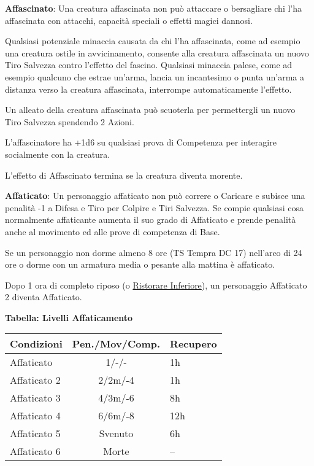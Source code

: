 \begin{multicols}{2}
\textbf{Affascinato}: Una creatura affascinata non può attaccare o bersagliare chi l'ha affascinata con attacchi, capacità speciali o effetti magici dannosi.

Qualsiasi potenziale minaccia causata da chi l'ha affascinata, come ad esempio una creatura ostile in avvicinamento, consente alla creatura affascinata un nuovo Tiro Salvezza contro l'effetto del fascino. Qualsiasi minaccia palese, come ad esempio qualcuno che estrae un'arma, lancia un incantesimo o punta un'arma a distanza verso la creatura affascinata, interrompe automaticamente l'effetto.

Un alleato della creatura affascinata può scuoterla per permettergli un nuovo Tiro Salvezza spendendo 2 Azioni.

L'affascinatore ha +1d6 su qualsiasi prova di Competenza per interagire socialmente con la creatura.

L'effetto di Affascinato termina se la creatura diventa morente.

\textbf{Affaticato}\hypertarget{affaticato}{}\label{affaticato}: Un personaggio affaticato non può correre o Caricare e subisce una penalità -1 a Difesa e Tiro per Colpire e Tiri Salvezza. Se compie qualsiasi cosa normalmente affaticante aumenta il suo grado di Affaticato e prende penalità anche al movimento ed alle prove di competenza di Base.

Se un personaggio non dorme almeno 8 ore (TS Tempra DC 17) nell'arco di 24 ore o dorme con un armatura media o pesante alla mattina è affaticato.

Dopo 1 ora di completo riposo (o \hyperlink{Ristorare Inferiore}{Ristorare Inferiore}), un personaggio Affaticato 2 diventa Affaticato.

\medskip

\textbf{Tabella: Livelli Affaticamento}

\medskip

\begin{tabularx}{0.45\textwidth}{lcl}
\textbf{Condizioni}& \textbf{Pen./Mov/Comp.}&\textbf{Recupero}\\
\hline
Affaticato &1/-/-&1h\\
Affaticato 2&2/2m/-4&1h\\
Affaticato 3&4/3m/-6&8h\\
Affaticato 4&6/6m/-8&12h\\
Affaticato 5&Svenuto&6h\\
Affaticato 6&Morte&--
\end{tabularx}


\end{multicols}
